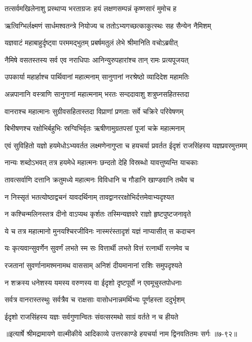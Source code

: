 
\twolineshloka
{तत्सर्वमखिलेनाशु प्रस्थाप्य भरताग्रजः}
{हयं लक्षणसम्पन्नं कृष्णसारं मुमोच ह} %

\twolineshloka
{ऋत्विग्भिर्लक्ष्मणं सार्धमश्वतन्त्रे नियोज्य च}
{ततोऽभ्यगच्छत्काकुत्स्थः सह सैन्येन नैमिशम्} %

\twolineshloka
{यज्ञवाटं महाबाहुर्दृष्ट्वा परममद्भुतम्}
{प्रबर्षमतुलं लेभे श्रीमानिति वचोऽब्रवीत्} %

\twolineshloka
{नैमिषे वसतस्तस्य सर्व एव नराधिपाः}
{आनिन्युरुपहारांश्च तान् रामः प्रत्यपूजयत्} %

\twolineshloka
{उपकार्या महार्हाश्च पार्थिवानां महात्मनाम्}
{सानुगानां नरश्रेष्ठो व्यादिदेश महामतिः} %

\twolineshloka
{अन्नपानानि वस्त्राणि सानुगानां महात्मनाम्}
{भरतः सन्ददावाशु शत्रुघ्नसहितस्तदा} %

\twolineshloka
{वानराश्च महात्मानः सुग्रीवसहितास्तदा}
{विप्राणां प्रणताः सर्वे चक्रिरे परिवेषणम्} %

\twolineshloka
{बिभीषणश्च रक्षोभिर्बहुभिः स्रग्विभिर्वृतः}
{ऋषीणामुग्रतपसां पूजां चक्रे महात्मनाम्} %

\threelineshloka
{एवं सुविहितो यज्ञो हयमेधोऽभ्यवर्तत}
{लक्ष्मणेनागुप्ता च हयचर्या प्रवर्तत}
{ईदृशं राजसिंहस्य यज्ञप्रवरमुत्तमम्} %

\twolineshloka
{नान्यः शब्दोऽभवत् तत्र हयमेधे महात्मनः}
{छन्दतो देहि विस्रब्धो यावत्तुष्यन्ति याचकाः} %

\twolineshloka
{तावत्सर्वाणि दत्तानि क्रतुमध्ये महात्मनः}
{विविधानि च गौडानि खाण्डवानि तथैव च} %

\twolineshloka
{न निस्सृतं भतत्योष्ठाद्वचनं यावदर्थिनाम्}
{तावद्वानररक्षोभिर्दत्तमेवाभ्यदृश्यत} %

\twolineshloka
{न कश्चिन्मलिनस्तत्र दीनो वाऽप्यथ कृर्शतः}
{तस्मिन्यज्ञवरे राज्ञो हृष्टपुष्टजनावृते} %

\twolineshloka
{ये च तत्र महात्मानो मुनयश्चिरजीविनः}
{नास्मरंस्तादृशं यज्ञं नाप्यासीत् स कदाचन} %

\twolineshloka
{यः कृत्यवान्सुवर्णेन सुवर्णं लभते स्म सः}
{वित्तार्थी लभते वित्तं रत्नार्थी रत्नमेव च} %

\twolineshloka
{रजतानां सुवर्णानामश्मनामथ वाससाम्}
{अनिशं दीयमानानां राशिः समुपदृश्यते} %

\twolineshloka
{न शक्रस्य धनेशस्य यमस्य वरुणस्य वा}
{ईदृशो दृष्टपूर्वो न एवमूचुस्तपोधनाः} %

\twolineshloka
{सर्वत्र वानरास्तस्थुः सर्वत्रैव च राक्षसाः}
{वासोधनान्नमर्थिभ्यः पूर्णहस्ता ददुर्भृशम्} %

\twolineshloka
{ईदृशो राजसिंहस्य यज्ञः सर्वगुणान्वितः}
{संवत्सरमथो साग्रं वर्तते न च हीयते} %


॥इत्यार्षे श्रीमद्रामायणे वाल्मीकीये आदिकाव्ये उत्तरकाण्डे हयचर्या नाम द्विनवतितमः सर्गः ॥७-९२॥
